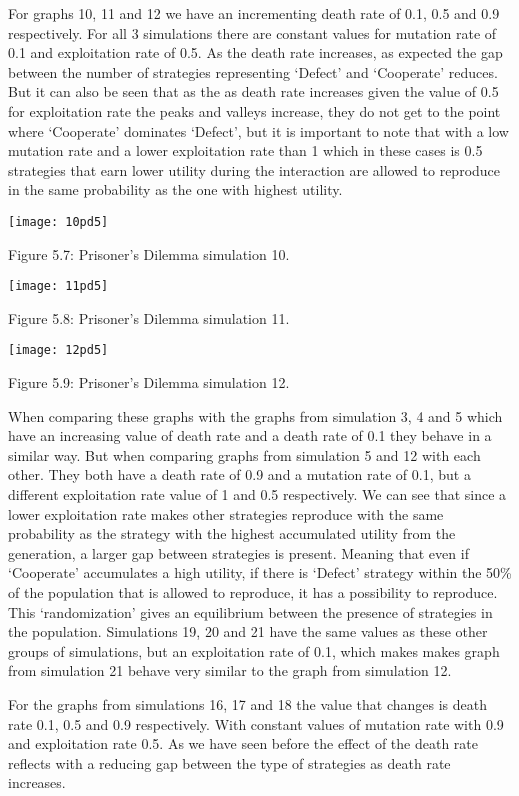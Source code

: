 \documentclass{article}
\begin{document}
For graphs 10, 11 and 12 we have an incrementing death rate of 0.1, 0.5 and 0.9 respectively. For all 3 simulations there are constant values for mutation rate of 0.1 and exploitation rate of 0.5. As the death rate increases, as expected the gap between the number of strategies representing `Defect' and `Cooperate' reduces. But it can also be seen that as the as death rate increases given the value of 0.5 for exploitation rate the peaks and valleys increase, they do not get to the point where `Cooperate' dominates `Defect', but it is important to note that with a low mutation rate and a lower exploitation rate than 1 which in these cases is 0.5 strategies that earn lower utility during the interaction are allowed to reproduce in the same probability as the one with highest utility. 
\begin{center}
	\texttt{[image: 10pd5]}
	
Figure 5.7: Prisoner's Dilemma simulation 10.
	
	\texttt{[image: 11pd5]}
	
Figure 5.8: Prisoner's Dilemma simulation 11.

	\texttt{[image: 12pd5]}

Figure 5.9: Prisoner's Dilemma simulation 12.
\end{center}
When comparing these graphs with the graphs from simulation 3, 4 and 5 which have an increasing value of death rate and a death rate of 0.1 they behave in a similar way. But when comparing graphs from simulation 5 and 12 with each other. They both have a death rate of 0.9 and a mutation rate of 0.1, but a different exploitation rate value of 1 and 0.5 respectively. We can see that since a lower exploitation rate makes other strategies reproduce with the same probability as the strategy with the highest accumulated utility from the generation, a larger gap between strategies is present. Meaning that even if `Cooperate' accumulates a high utility, if there is `Defect' strategy within the 50\% of the population that is allowed to reproduce, it has a possibility to reproduce. This `randomization' gives an equilibrium between the presence of strategies in the population. Simulations 19, 20 and 21 have the same values as these other groups of simulations, but an exploitation rate of 0.1, which makes makes graph from simulation 21 behave very similar to the graph from simulation 12.

For the graphs from simulations 16, 17 and 18 the value that changes is death rate 0.1, 0.5 and 0.9 respectively. With constant values of mutation rate with 0.9 and exploitation rate 0.5. As we have seen before the effect of the death rate reflects with a reducing gap between the type of strategies as death rate increases. 
 
\end{document}
